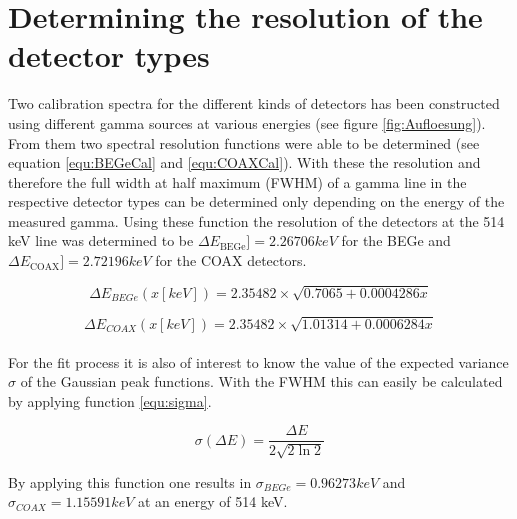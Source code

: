 \appendix

\chapter{Determining the resolution of the detector types}
\label{sec:ResDetermination}


Two calibration spectra for the different kinds of detectors has been constructed using different gamma sources at various energies (see figure \ref{fig:Aufloesung})\cite{agostini_background_2017}.
From them two spectral resolution functions were able to be determined (see equation \ref{equ:BEGeCal} and \ref{equ:COAXCal}).
With these the resolution and therefore the full width at half maximum (FWHM) of a gamma line in the respective detector types can be determined only depending on the energy of the measured gamma.
Using these function the resolution of the detectors at the 514 keV line was determined to be $\Delta E_{\mathrm{BEGe}}] =2.26706\unit{keV}$ for the BEGe and $\Delta E_{\mathrm{COAX}}] = 2.72196\unit{keV}$ for the COAX detectors.



\begin{equation}
\Delta E_{BEGe}(x[keV]) = 2.35482 \times \sqrt{0.7065+0.0004286x}
\label{equ:BEGeCal}
\end{equation}

\begin{equation}
\Delta E_{COAX}(x[keV]) = 2.35482 \times \sqrt{1.01314+0.0006284x}
\label{equ:COAXCal}
\end{equation}
\\

For the fit process it is also of interest to know the value of the expected variance $\sigma$ of the Gaussian peak functions.
With the FWHM this can easily be calculated by applying function \ref{equ:sigma}.

\begin{equation}
\sigma (\Delta E) = \frac{\Delta E}{2\sqrt{2\ln2}}
\label{equ:sigma}
\end{equation}

By applying this function one results in $\sigma_{BEGe} = 0.96273\unit{keV}$ and $\sigma_{COAX} = 1.15591\unit{keV}$ at an energy of 514 keV.

